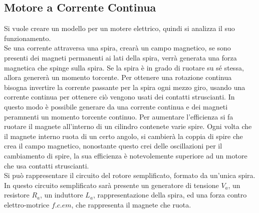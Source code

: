 \documentclass{article}
\numberwithin{equation}{subsection}
\begin{document}
\subsection{Motore a Corrente Continua}
Si vuole creare un modello per un motere elettrico, quindi si analizza il suo funzionamento. \\
Se una corrente attraversa una spira, crearà un campo magnetico, se sono 
presenti dei magneti permanenti ai lati della spira, verrà generata una forza magnetica che spinge sulla spira. Se la spira è in grado di ruotare su sé stessa, allora genererà 
un momento torcente. Per ottenere una rotazione continua bisogna invertire la corrente passante per la spira ogni mezzo giro, usando una corrente continua per ottenere ciò 
vengono usati dei contatti struscianti. In questo modo è possibile generare 
da una corrente continua e dei magneti peramnenti un momento torcente continuo. Per aumentare l'efficienza si fa ruotare il magnete all'interno di un cilindro contenete varie 
spire. Ogni volta che il magnete interno ruota di un certo angolo, si cambierà la coppia di spire che crea il campo magnetico, nonostante questo crei delle oscillazioni per 
il cambiamento di spire, la sua efficienza è notevolemente superiore ad un motore che usa contatti struscianti. \\
Si può rappresentare il circuito del rotore semplificato, formato da un'unica spira. In questo circuito semplificato sarà presente un generatore di tensione $V_a$, 
un resistore $R_a$, un induttore $L_a$, rappresentazione della spira, ed una forza contro elettro-motrice $f.c.em$, che rappresenta il magnete che ruota. 

\end{document}
